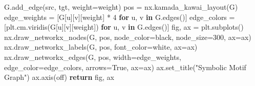 \documentclass[
  11pt,
]{article}
\newenvironment{Shaded}{\begin{snugshade}}{\end{snugshade}}
\newcommand{\ControlFlowTok}[1]{\textcolor[rgb]{0.00,0.23,0.31}{\textbf{#1}}}
\newcommand{\DecValTok}[1]{\textcolor[rgb]{0.68,0.00,0.00}{#1}}
\newcommand{\KeywordTok}[1]{\textcolor[rgb]{0.00,0.23,0.31}{\textbf{#1}}}
\newcommand{\NormalTok}[1]{\textcolor[rgb]{0.00,0.23,0.31}{#1}}
\newcommand{\OperatorTok}[1]{\textcolor[rgb]{0.37,0.37,0.37}{#1}}
\newcommand{\StringTok}[1]{\textcolor[rgb]{0.13,0.47,0.30}{#1}}
\newcommand{\VariableTok}[1]{\textcolor[rgb]{0.07,0.07,0.07}{#1}}
\begin{document}
\begin{Shaded}
\begin{Highlighting}[]
\NormalTok{        G.add\_edge(src, tgt, weight}\OperatorTok{=}\NormalTok{weight)}
\NormalTok{    pos }\OperatorTok{=}\NormalTok{ nx.kamada\_kawai\_layout(G)}
\NormalTok{    edge\_weights }\OperatorTok{=}\NormalTok{ [G[u][v][}\StringTok{\textquotesingle{}weight\textquotesingle{}}\NormalTok{] }\OperatorTok{*} \DecValTok{4} \ControlFlowTok{for}\NormalTok{ u, v }\KeywordTok{in}\NormalTok{ G.edges()]}
\NormalTok{    edge\_colors }\OperatorTok{=}\NormalTok{ [plt.cm.viridis(G[u][v][}\StringTok{\textquotesingle{}weight\textquotesingle{}}\NormalTok{]) }\ControlFlowTok{for}\NormalTok{ u, v }\KeywordTok{in}\NormalTok{ G.edges()]}
\NormalTok{    fig, ax }\OperatorTok{=}\NormalTok{ plt.subplots()}
\NormalTok{    nx.draw\_networkx\_nodes(G, pos, node\_color}\OperatorTok{=}\StringTok{\textquotesingle{}black\textquotesingle{}}\NormalTok{, node\_size}\OperatorTok{=}\DecValTok{300}\NormalTok{, ax}\OperatorTok{=}\NormalTok{ax)}
\NormalTok{    nx.draw\_networkx\_labels(G, pos, font\_color}\OperatorTok{=}\StringTok{\textquotesingle{}white\textquotesingle{}}\NormalTok{, ax}\OperatorTok{=}\NormalTok{ax)}
\NormalTok{    nx.draw\_networkx\_edges(G, pos, width}\OperatorTok{=}\NormalTok{edge\_weights, edge\_color}\OperatorTok{=}\NormalTok{edge\_colors, arrows}\OperatorTok{=}\VariableTok{True}\NormalTok{, ax}\OperatorTok{=}\NormalTok{ax)}
\NormalTok{    ax.set\_title(}\StringTok{"Symbolic Motif Graph"}\NormalTok{)}
\NormalTok{    ax.axis(}\StringTok{\textquotesingle{}off\textquotesingle{}}\NormalTok{)}
    \ControlFlowTok{return}\NormalTok{ fig, ax}


\end{Highlighting}
\end{Shaded}
\end{document}
